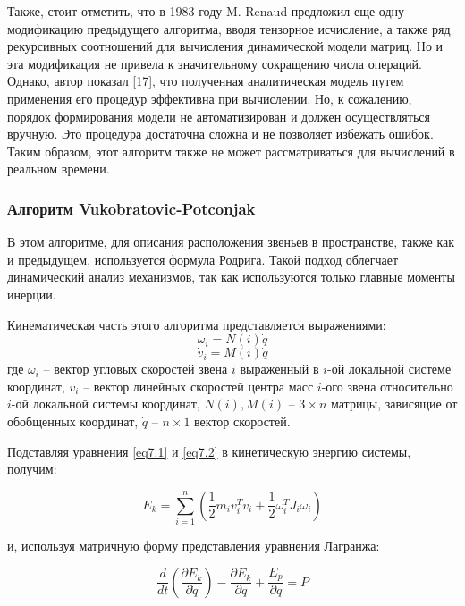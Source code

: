 Также, стоит отметить, что в 1983 году M. Renaud предложил еще одну модификацию предыдущего алгоритма, вводя тензорное исчисление, а также ряд рекурсивных соотношений для вычисления динамической модели матриц. Но и эта модификация не привела к значительному сокращению числа операций. Однако, автор показал [17], что полученная аналитическая модель путем применения его процедур эффективна при вычислении. Но, к сожалению, порядок формирования модели не автоматизирован и должен осуществляться вручную. Это процедура достаточна сложна и не позволяет избежать ошибок. Таким образом, этот алгоритм также не может рассматриваться для вычислений в реальном времени.

\subsubsection{Алгоритм Vukobratovic-Potconjak}
В этом алгоритме, для описания расположения звеньев в пространстве, также как и предыдущем, используется формула Родрига. Такой подход облегчает динамический анализ механизмов, так как используются только главные моменты инерции.

Кинематическая часть этого алгоритма представляется выражениями:
\begin{equation}\label{eq7.1}
\omega_i = N(i) \dot q
\end{equation}
\begin{equation}\label{eq7.2}
\dot v_i = M(i) \dot q
\end{equation}
где $\omega_i$ -- вектор угловых скоростей звена $i$ выраженный в $i$-ой локальной системе координат, $v_i$ -- вектор линейных скоростей центра масс $i$-ого звена относительно $i$-ой локальной системы координат, $N(i), M(i)$ -- $3 \times n$ матрицы, зависящие от обобщенных координат, $\dot q$ -- $n \times 1$ вектор скоростей.

Подставляя уравнения \ref{eq7.1} и \ref{eq7.2} в кинетическую энергию системы, получим:

\begin{equation}
E_k = \sum_{i=1}^{n} (\frac{1}{2} m_i v_i^T v_i + \frac{1}{2} \omega_i^T J_i \omega_i)
\end{equation}

и, используя матричную форму представления уравнения Лагранжа:

\begin{equation}
\frac{d}{dt}
(\frac{\partial E_k}{\partial \dot q})
- \frac{\partial E_k}{\partial q} + \frac{E_p}{\partial q} = P
\end{equation}

